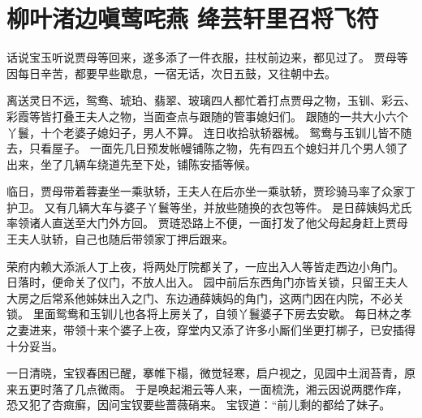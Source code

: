 \chapter{柳叶渚边嗔莺咤燕 \quad 绛芸轩里召将飞符}
\par
话说宝玉听说贾母等回来，遂多添了一件衣服，拄杖前边来，都见过了。
贾母等因每日辛苦，都要早些歇息，一宿无话，次日五鼓，又往朝中去。
\par
离送灵日不远，鸳鸯、琥珀、翡翠、玻璃四人都忙着打点贾母之物，玉钏、彩云、彩霞等皆打叠王夫人之物，当面查点与跟随的管事媳妇们。
跟随的一共大小六个丫鬟，十个老婆子媳妇子，男人不算。
连日收拾驮轿器械。
鸳鸯与玉钏儿皆不随去，只看屋子。
一面先几日预发帐幔铺陈之物，先有四五个媳妇并几个男人领了出来，坐了几辆车绕道先至下处，铺陈安插等候。
\par
临日，贾母带着蓉妻坐一乘驮轿，王夫人在后亦坐一乘驮轿，贾珍骑马率了众家丁护卫。
又有几辆大车与婆子丫鬟等坐，并放些随换的衣包等件。
是日薛姨妈尤氏率领诸人直送至大门外方回。
贾琏恐路上不便，一面打发了他父母起身赶上贾母王夫人驮轿，自己也随后带领家丁押后跟来。
\par
荣府内赖大添派人丁上夜，将两处厅院都关了，一应出入人等皆走西边小角门。
日落时，便命关了仪门，不放人出入。
园中前后东西角门亦皆关锁，只留王夫人大房之后常系他姊妹出入之门、东边通薛姨妈的角门，这两门因在内院，不必关锁。
里面鸳鸯和玉钏儿也各将上房关了，自领丫鬟婆子下房去安歇。
每日林之孝之妻进来，带领十来个婆子上夜，穿堂内又添了许多小厮们坐更打梆子，已安插得十分妥当。
\par
一日清晓，宝钗春困已醒，搴帷下榻，微觉轻寒，启户视之，见园中土润苔青，原来五更时落了几点微雨。
于是唤起湘云等人来，一面梳洗，湘云因说两腮作痒，恐又犯了杏癍癣，因问宝钗要些蔷薇硝来。
宝钗道：“前儿剩的都给了妹子。
